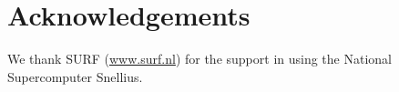 \section*{Acknowledgements}

We thank SURF (\url{www.surf.nl}) for the support in using the National Supercomputer Snellius.